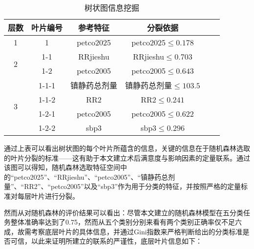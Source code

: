 \begin{table}[H]
    \centering  
    \caption{树状图信息挖掘}
    \begin{tabular}{c c c c c c}  
    	\toprule[1.5pt]  
    	层数 & 叶片编号 & 参考特征 & 分裂依据\\  
    	\midrule[1pt]    
    	1                  & 1     & petco2025     & petco2025$\leq 0.178$       \\ 
    
        \multirow{2}{*}{2} & 1-1   & RRjieshu      & RRjieshu$\leq 0.703$           \\
                           & 1-2   & petco2005     & petco2005$\leq 0.643$       \\
                           
        \multirow{4}{*}{3} & 1-1-1 & 镇静药总剂量  & 镇静药总剂量$\leq103.5$     \\
                           & 1-1-2 & RR2           & RR2$\leq0.241$              \\
                           & 1-2-1 & petco2005     & petco2005$\leq0.622$        \\
                           & 1-2-2 & sbp3          & sbp3$\leq0.296$             \\
    	\toprule[1.5pt]  
    \end{tabular}  
\end{table} 

通过上表可以看出树状图的每个叶片所蕴含的信息，关键的信息在于随机森林选取的叶片分裂的标准——这有助于本文建立术后满意度与影响因素的定量联系。通过该图可以得知，随机森林选取特征空间中的“petco2025”、“RRjieshu”、“petco2005”、“镇静药总剂量”、“RR2”、“petco2005”以及“sbp3”作为用于分类的特征，并按照严格的定量标准对每层叶片进行分裂。

然而从对随机森林的评价结果可以看出：尽管本文建立的随机森林模型在五分类任务整体准确率达到了0.75，然而从五个类别分别来看有两个类别正确率仅不足六成，故需考察底层叶片的具体信息，并通过Gini指数来严格判断给出的分类标准是否可信，以此来证明所建立的联系的严谨性，底层叶片信息如下：

